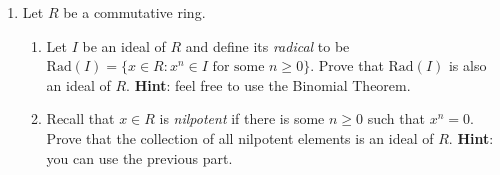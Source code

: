 \documentclass[11pt]{article}
\begin{document}
\begin{enumerate}
\item Let $R$ be a commutative ring.
\begin{enumerate}
\item Let $I$ be an ideal of $R$ and define its \emph{radical} to be $\mathrm{Rad}(I) = \{x \in R\colon x^n \in I \textrm{ for some $n \geq 0$}\}$. Prove that $\mathrm{Rad}(I)$ is also an ideal of $R$. {\bf Hint}: feel free to use the Binomial Theorem.
\item Recall that $x\in R$ is \emph{nilpotent} if there is some $n \geq 0$ such that $x^n=0$. Prove that the collection of all nilpotent elements is an ideal of $R$. {\bf Hint}: you can use the previous part.
\end{enumerate}



\end{enumerate}
\end{document}
